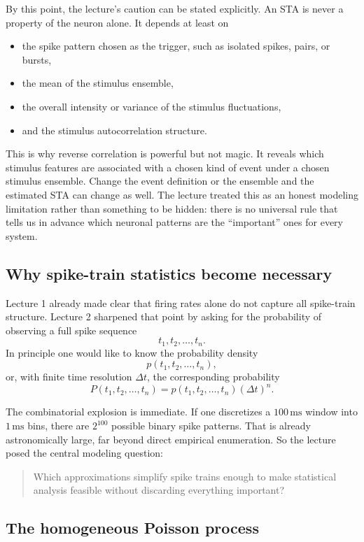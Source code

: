 \documentclass[11pt]{article}
\begin{document}
By this point, the lecture's caution can be stated explicitly. An STA is never a property of the neuron alone. It depends at least on
\begin{itemize}
    \item the spike pattern chosen as the trigger, such as isolated spikes, pairs, or bursts,
    \item the mean of the stimulus ensemble,
    \item the overall intensity or variance of the stimulus fluctuations,
    \item and the stimulus autocorrelation structure.
\end{itemize}

This is why reverse correlation is powerful but not magic. It reveals which stimulus features are associated with a chosen kind of event under a chosen stimulus ensemble. Change the event definition or the ensemble and the estimated STA can change as well. The lecture treated this as an honest modeling limitation rather than something to be hidden: there is no universal rule that tells us in advance which neuronal patterns are the ``important'' ones for every system.

\subsection{Why spike-train statistics become necessary}

Lecture 1 already made clear that firing rates alone do not capture all spike-train structure. Lecture 2 sharpened that point by asking for the probability of observing a full spike sequence
\[
t_1, t_2, \dots, t_n.
\]
In principle one would like to know the probability density
\[
p(t_1,t_2,\dots,t_n),
\]
or, with finite time resolution $\Delta t$, the corresponding probability
\[
P(t_1,t_2,\dots,t_n) = p(t_1,t_2,\dots,t_n)(\Delta t)^n.
\]

The combinatorial explosion is immediate. If one discretizes a $100\,\mathrm{ms}$ window into $1\,\mathrm{ms}$ bins, there are $2^{100}$ possible binary spike patterns. That is already astronomically large, far beyond direct empirical enumeration. So the lecture posed the central modeling question:
\begin{quote}
Which approximations simplify spike trains enough to make statistical analysis feasible without discarding everything important?
\end{quote}

\subsection{The homogeneous Poisson process}
\end{document}
